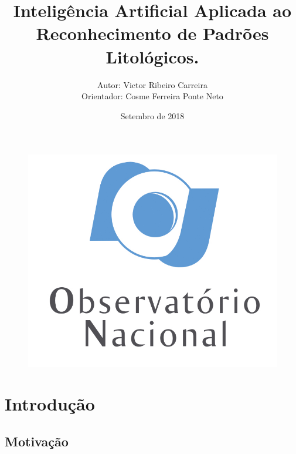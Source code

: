 \documentclass[aspectratio=10]{beamer} %
\author[Carreira,V.R.]{Autor: Victor Ribeiro Carreira \\ Orientador: Cosme Ferreira Ponte Neto}
\title{Inteligência Artificial Aplicada  ao  Reconhecimento de Padrões Litológicos.}
\institute{Pós-Graduação em Geofísica}
\date{Setembro de 2018}
\begin{document}
{%
	\begin{frame}
	\begin{figure}
		\centering
		\includegraphics[scale=0.4]{Imagens/logonvertical.jpg} 
	\end{figure}
\end{frame}
}
\bgroup
\makeatletter
{}
\makeatother
\maketitle
\egroup 
{}
\setcounter{framenumber}{0}
\AtBeginSection[]
%
%

\section{Introdução}
\subsection{Motivação}
\end{document}
